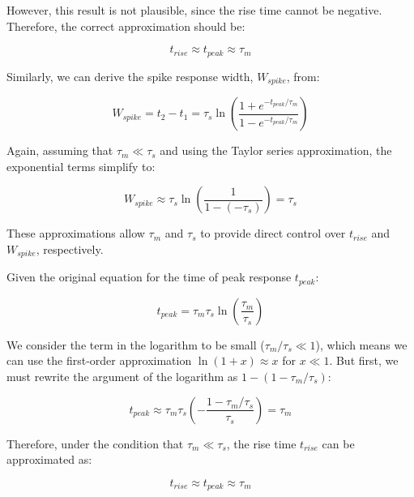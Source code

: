 However, this result is not plausible, since the rise time cannot be negative. Therefore, the correct approximation should be:

\begin{equation}
t_{rise} \approx t_{peak} \approx \tau_m
\end{equation}

Similarly, we can derive the spike response width, $W_{spike}$, from:

\begin{equation}
W_{spike} = t_2 - t_1 = \tau_s \ln\left(\frac{1 + e^{-t_{peak}/\tau_m}}{1 - e^{-t_{peak}/\tau_m}}\right)
\end{equation}

Again, assuming that $\tau_m \ll \tau_s$ and using the Taylor series approximation, the exponential terms simplify to:

\begin{equation}
W_{spike} \approx \tau_s \ln\left(\frac{1}{1 - (-\tau_s)}\right) = \tau_s
\end{equation}

These approximations allow $\tau_m$ and $\tau_s$ to provide direct control over $t_{rise}$ and $W_{spike}$, respectively.


Given the original equation for the time of peak response $t_{peak}$:

\begin{equation}
t_{peak} = \tau_m \tau_s \ln\left(\frac{\tau_m}{\tau_s}\right)
\end{equation}

We consider the term in the logarithm to be small ($\tau_m/\tau_s \ll 1$), which means we can use the first-order approximation $\ln(1+x) \approx x$ for $x \ll 1$. But first, we must rewrite the argument of the logarithm as $1 - (1 - \tau_m/\tau_s)$:

\begin{equation}
t_{peak} \approx \tau_m \tau_s \left(-\frac{1 - \tau_m/\tau_s}{\tau_s}\right) = \tau_m
\end{equation}

Therefore, under the condition that $\tau_m \ll \tau_s$, the rise time $t_{rise}$ can be approximated as:

\begin{equation}
t_{rise} \approx t_{peak} \approx \tau_m
\end{equation}





















